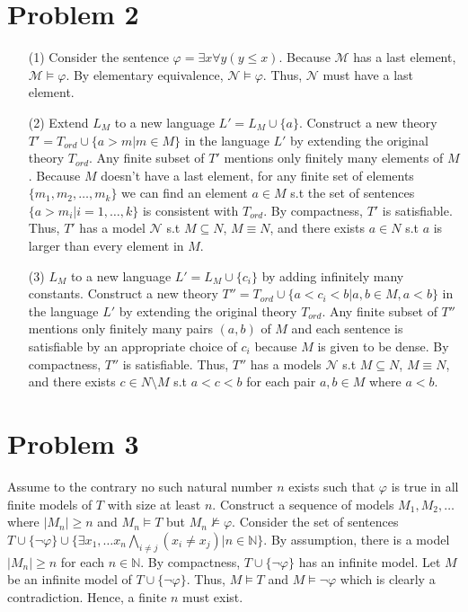 \documentclass[10pt]{article}
\begin{document}
\section*{Problem 2}
    \begin{itemize}
        \item [(1)] Consider the sentence $\varphi=\exists x\forall y(y\le x)$. Because $\mathcal{M}$ has a last element, $\mathcal{M}\models\varphi$. By elementary equivalence, $\mathcal{N}\models\varphi$. Thus, $\mathcal{N}$ must have a last element.
        \item [(2)] Extend $L_M$ to a new language $L'=L_M\cup\{a\}$. 
        Construct a new theory $T'=T_{ord}\cup\{a>m|m\in M\}$ in the language $L'$ by extending the original theory $T_{ord}$.
        Any finite subset of $T'$ mentions only finitely many elements of $M$. 
        Because $M$ doesn't have a last element, for any finite set of elements $\{m_1,m_2,\ldots,m_k\}$ we can find an element $a\in M$ s.t the set of sentences $\{a>m_i|i=1,\ldots,k\}$ is consistent with $T_{ord}$.
        By compactness, $T'$ is satisfiable. Thus, $T'$ has a model $\mathcal{N}$ s.t $M\subseteq N$, $M\equiv N$, and there exists $a\in N$ s.t $a$ is larger than every element in $M$.
        \item [(3)] $L_M$ to a new language $L'=L_M\cup\{c_i\}$ by adding infinitely many constants.
        Construct a new theory $T''=T_{ord}\cup\{a<c_i<b|a,b\in M,a<b\}$ in the language $L'$ by extending the original theory $T_{ord}$.
        Any finite subset of $T''$ mentions only finitely many pairs $(a,b)$ of $M$ and each sentence is satisfiable by an appropriate choice of $c_i$ because $M$ is given to be dense.
        By compactness, $T''$ is satisfiable. Thus, $T''$ has a models $\mathcal{N}$ s.t $M\subseteq N$, $M\equiv N$, and there exists $c\in N\setminus M$ s.t $a<c<b$ for each pair $a,b\in M$ where $a<b$.
    \end{itemize}
\section*{Problem 3}
Assume to the contrary no such natural number $n$ exists such that $\varphi$ is true in all finite models of $T$ with size at least $n$.
Construct a sequence of models $M_1,M_2,\ldots$ where $\lvert M_n\rvert\ge n$ and $M_n\models T$ but $M_n\not\models \varphi$.
Consider the set of sentences $T\cup\{\lnot\varphi\}\cup\{\exists x_1,\ldots x_n\underset{i\neq j}{\bigwedge}(x_i\neq x_j)|n\in\mathbb{N}\}$. 
By assumption, there is a model $|M_n|\ge n$ for each $n\in\mathbb{N}$.
By compactness, $T\cup\{\lnot\varphi\}$ has an infinite model. 
Let $M$ be an infinite model of $T\cup\{\lnot\varphi\}$.
Thus, $M\models T$ and $M\models\lnot\varphi$ which is clearly a contradiction.
Hence, a finite $n$ must exist.
\end{document}
